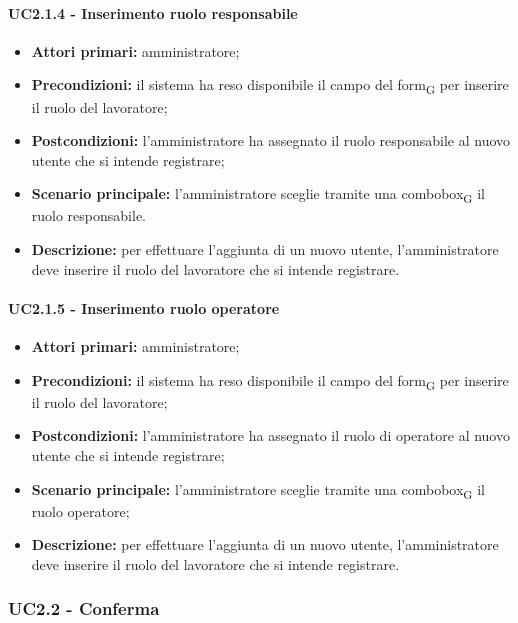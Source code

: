 \paragraph{UC2.1.4 - Inserimento ruolo responsabile}

\begin{itemize}
	\item 	\textbf{Attori primari:} amministratore;
	\item 	\textbf{Precondizioni:} il sistema ha reso disponibile il campo del form\textsubscript{G} per inserire il ruolo del lavoratore;
	\item 	\textbf{Postcondizioni:} l'amministratore ha assegnato il ruolo responsabile al nuovo utente che si intende registrare;
	\item 	\textbf{Scenario principale:} l'amministratore sceglie tramite una combobox\textsubscript{G} il ruolo responsabile.
	\item 	\textbf{Descrizione:} per effettuare l'aggiunta di un nuovo utente, l'amministratore deve inserire il ruolo del lavoratore che si intende registrare.
	
\end{itemize}

\paragraph{UC2.1.5 - Inserimento ruolo operatore}

\begin{itemize}
	\item 	\textbf{Attori primari:} amministratore;
	\item 	\textbf{Precondizioni:} il sistema ha reso disponibile il campo del form\textsubscript{G} per inserire il ruolo del lavoratore;
	\item 	\textbf{Postcondizioni:} l'amministratore ha assegnato il ruolo di operatore al nuovo utente che si intende registrare;
	\item 	\textbf{Scenario principale:} l'amministratore sceglie tramite una combobox\textsubscript{G} il ruolo operatore;
	\item 	\textbf{Descrizione:} per effettuare l'aggiunta di un nuovo utente, l'amministratore deve inserire il ruolo del lavoratore che si intende registrare. 
	
\end{itemize}


\subsubsection{UC2.2 - Conferma}

